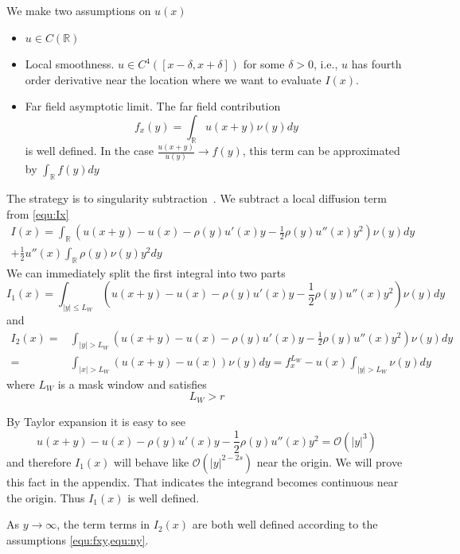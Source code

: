 \documentclass[3p,,preprint,12pt]{elsarticle}
\newcommand{\RR}[0]{\mathbb{R}}
\theoremstyle{definition}
\begin{document}
We make two assumptions on $u(x)$
\begin{itemize}
	\item $u\in C(\RR)$ 
	\item Local smoothness. $u\in C^4([x-\delta, x+\delta])$ for some $\delta>0$, i.e., $u$ has fourth order derivative near the location where we want to evaluate $I(x)$.
	\item Far field asymptotic limit. The far field contribution
	\begin{equation}\label{equ:fxy}
		f_x(y) = \int_{\RR}u(x+y)\nu(y)dy
	\end{equation}
	is well defined. In the case $\frac{u(x+y)}{u(y)}\rightarrow f(y)$, this term can be approximated by $\int_\RR f(y)dy$
\end{itemize}

The strategy is to singularity subtraction~\cite{minden2018simple}. We subtract a local diffusion term from \cref{equ:Ix}
\begin{multline}\label{equ:evalIx1d}
	I(x) = \int_{\RR}(u(x+y)-u(x)-\rho(y)u'(x)y- \frac{1}{2}\rho(y)u''(x)y^2 )\nu(y)dy \\
	+ \frac{1}{2}u''(x)\int_\RR \rho(y)\nu(y)y^2 dy
\end{multline}
We can immediately split the first integral into two parts
\begin{equation}
	I_1(x) = \int_{|y|\leq L_W}(u(x+y)-u(x)-\rho(y)u'(x)y- \frac{1}{2}\rho(y)u''(x)y^2 )\nu(y)dy
\end{equation}
and
\begin{align}
	I_2(x) =& \int_{|y|> L_W}(u(x+y)-u(x)-\rho(y)u'(x)y- \frac{1}{2}\rho(y)u''(x)y^2 )\nu(y)dy\\
	 = &\int_{|x|> L_W}(u(x+y)-u(x) )\nu(y)dy = f_x^{L_W} - u(x)\int_{|y|> L_W}\nu(y)dy
\end{align}
where $L_W$ is a mask window and satisfies
\begin{equation}
	L_W > r
\end{equation}

By Taylor expansion it is easy to see
\begin{equation}
	u(x+y)-u(x)-\rho(y)u'(x)y- \frac{1}{2}\rho(y)u''(x)y^2 =\mathcal{O}(|y|^3)
\end{equation}
and therefore $I_1(x)$ will behave like $\mathcal{O}(|y|^{2-2s})$ near the origin. We will prove this fact in the appendix. That indicates the integrand becomes continuous near the origin. Thus $I_1(x)$ is well defined.   

As $y\rightarrow \infty$, the term terms in $I_2(x)$ are both well defined according to the assumptions \cref{equ:fxy,equ:ny}. 
\end{document}
